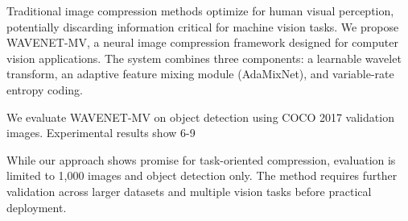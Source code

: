 Traditional image compression methods optimize for human visual perception, potentially discarding information critical for machine vision tasks. We propose WAVENET-MV, a neural image compression framework designed for computer vision applications. The system combines three components: a learnable wavelet transform, an adaptive feature mixing module (AdaMixNet), and variable-rate entropy coding.

We evaluate WAVENET-MV on object detection using COCO 2017 validation images. Experimental results show 6-9%

While our approach shows promise for task-oriented compression, evaluation is limited to 1,000 images and object detection only. The method requires further validation across larger datasets and multiple vision tasks before practical deployment.